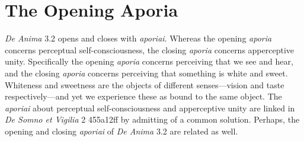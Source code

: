 %
%
%


\section{The Opening Aporia} %
\label{sec:the_opening_aporia}

\emph{De Anima} 3.2 opens and closes with \emph{aporiai}. Whereas the opening \emph{aporia} concerns perceptual self-consciousness, the closing \emph{aporia} concerns apperceptive unity. Spe\-cifically the opening \emph{aporia} concerns perceiving that we see and hear, and the closing \emph{aporia} concerns perceiving that something is white and sweet. Whiteness and sweetness are the objects of different senses—vision and taste respectively—and yet we experience these as bound to the same object. The \emph{aporiai} about perceptual self-consciousness and apperceptive unity are linked in \emph{De Somno et Vigilia} 2 455a12ff by admitting of a common solution. Perhaps, the opening and closing \emph{aporiai} of \emph{De Anima} 3.2 are related as well.


